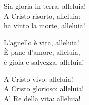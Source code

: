 
\strofa Sia gloria in terra, alleluia!\\
A Cristo risorto, alleluia:\\
ha vinto la morte, alleluia!

\spazio

\strofa L'agnello è vita, alleluia!\\
È pane d'amore, alleluia,\\
è gioia e salvezza, alleluia!

\spazio

\strofa A Cristo vivo: alleluia!\\
A Cristo glorioso: alleluia!\\
Al Re della vita: alleluia!
